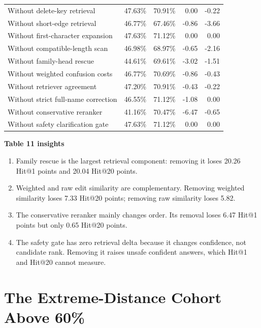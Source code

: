 \documentclass[11pt,a4paper]{article}
\begin{document}
\begin{longtable}{@{}lrrrr@{}}
Without delete-key retrieval & 47.63\% & 70.91\% & 0.00 & -0.22 \\
Without short-edge retrieval & 46.77\% & 67.46\% & -0.86 & -3.66 \\
Without first-character expansion & 47.63\% & 71.12\% & 0.00 & 0.00 \\
Without compatible-length scan & 46.98\% & 68.97\% & -0.65 & -2.16 \\
Without family-head rescue & 44.61\% & 69.61\% & -3.02 & -1.51 \\
Without weighted confusion costs & 46.77\% & 70.69\% & -0.86 & -0.43 \\
Without retriever agreement & 47.20\% & 70.91\% & -0.43 & -0.22 \\
Without strict full-name correction & 46.55\% & 71.12\% & -1.08 & 0.00 \\
Without conservative reranker & 41.16\% & 70.47\% & -6.47 & -0.65 \\
Without safety clarification gate & 47.63\% & 71.12\% & 0.00 & 0.00 \\
\bottomrule
\end{longtable}
\normalsize

\textbf{Table 11 insights}
\begin{enumerate}
  \item Family rescue is the largest retrieval component: removing it loses
        20.26 Hit@1 points and 20.04 Hit@20 points.
  \item Weighted and raw edit similarity are complementary. Removing weighted
        similarity loses 7.33 Hit@20 points; removing raw similarity loses 5.82.
  \item The conservative reranker mainly changes order. Its removal loses 6.47
        Hit@1 points but only 0.65 Hit@20 points.
  \item The safety gate has zero retrieval delta because it changes confidence,
        not candidate rank. Removing it raises unsafe confident answers, which
        Hit@1 and Hit@20 cannot measure.
\end{enumerate}

\clearpage
\section{The Extreme-Distance Cohort Above 60\%}
\end{document}
